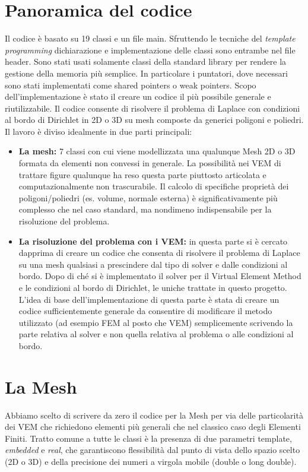 \documentclass[oneside,12pt]{book}  %
\theoremstyle{plain}
\theoremstyle{definition}
\theoremstyle{remark}
\numberwithin{equation}{chapter} %
\begin{document}
\section{Panoramica del codice}
\label{sec:panoramica}
Il codice \`e basato su 19 classi e un file main. Sfruttendo le
tecniche del \textit{template programming} dichiarazione e
implementazione delle classi sono entrambe nel file header.
Sono stati usati solamente classi della standard library per rendere
la gestione della memoria pi\`u semplice. In particolare i puntatori,
dove necessari sono stati implementati come shared pointers o weak
pointers. 
Scopo dell'implementazione \`e stato il creare un codice il pi\`u
possibile generale e riutilizzabile. Il codice consente di risolvere
il problema di Laplace con condizioni al bordo di Dirichlet in 2D o 3D
su mesh composte da generici poligoni e poliedri.
Il lavoro \`e diviso idealmente in due parti principali:
\begin{itemize}
\item
\textbf{La mesh:} 7 classi con cui viene modellizzata una qualunque
Mesh 2D o 3D formata da elementi non convessi in generale. La
possibilit\`a nei VEM di trattare figure qualunque ha
reso questa parte piuttosto articolata e computazionalmente non
trascurabile. Il calcolo di specifiche propriet\`a dei
poligoni/poliedri (es. volume, normale esterna) \`e significativamente
pi\`u complesso che nel caso standard, ma nondimeno indispensabile per
la risoluzione del problema.

\item
\textbf{La risoluzione del problema con i VEM:} in questa parte si \`e
cercato dapprima di creare un codice che consenta di risolvere il
problema di Laplace su una mesh qualsiasi a prescindere dal tipo di
solver e dalle condizioni al bordo. Dopo di ch\'e si \`e implementato
il solver per il Virtual Element Method e le condizioni al bordo di
Dirichlet, le uniche trattate in questo progetto.
L'idea di base dell'implementazione di questa parte \`e stata di
creare un codice sufficientemente generale da consentire di modificare
il metodo utilizzato (ad esempio FEM al posto che VEM) semplicemente
scrivendo la parte relativa al solver e non quella relativa al
problema o alle condizioni al bordo.

\end{itemize}


\section{La Mesh}
\label{sec:mesh}
Abbiamo scelto di scrivere da zero il codice per la Mesh per via delle
particolarit\`a dei VEM che richiedono elementi pi\`u generali che nel
classico caso degli Elementi Finiti. Tratto comune a tutte le classi
\`e la presenza di due parametri template, \textit{embedded} e
\textit{real}, che garantiscono flessibilit\`a dal punto di vista
dello spazio scelto (2D o 3D) e della precisione dei numeri a virgola
mobile (double o long double). 
\end{document}
